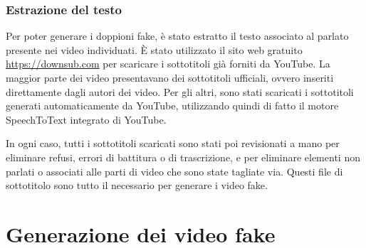 \subsubsection{Estrazione del testo}

Per poter generare i doppioni fake, è stato estratto il testo associato al parlato presente nei video individuati. È stato utilizzato il sito web gratuito \url{https://downsub.com} per scaricare i sottotitoli già forniti da YouTube. La maggior parte dei video presentavano dei sottotitoli ufficiali, ovvero inseriti direttamente dagli autori dei video. Per gli altri, sono stati scaricati i sottotitoli generati automaticamente da YouTube, utilizzando quindi di fatto il motore SpeechToText integrato di YouTube.

In ogni caso, tutti i sottotitoli scaricati sono stati poi revisionati a mano per eliminare refusi, errori di battitura o di trascrizione, e per eliminare elementi non parlati o associati alle parti di video che sono state tagliate via. Questi file di sottotitolo sono tutto il necessario per generare i video fake.

\section{Generazione dei video fake}

\clearpage